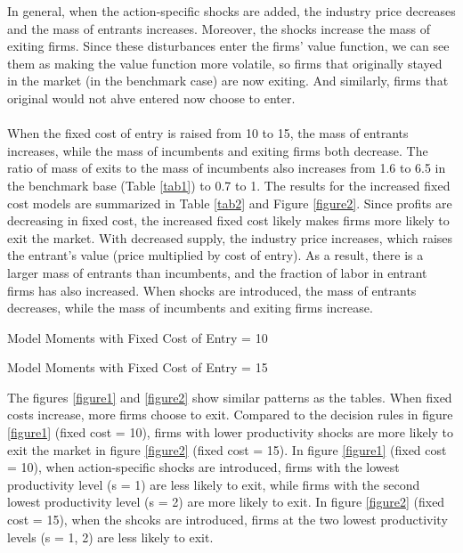 \documentclass[12pt]{article}
\begin{document}
In general, when the action-specific shocks are added, the industry price decreases and the mass of entrants increases. Moreover, the shocks increase the mass of exiting firms. Since these disturbances enter the firms' value function, we can see them as making the value function more volatile, so firms that originally stayed in the market (in the benchmark case) are now exiting. And similarly, firms that original would not ahve entered now choose to enter. \\\\
When the fixed cost of entry is raised from 10 to 15, the mass of entrants increases, while the mass of incumbents and exiting firms both decrease. The ratio of mass of exits to the mass of incumbents also increases from 1.6 to 6.5 in the benchmark base (Table \ref{tab1}) to 0.7 to 1. The results for the increased fixed cost models are summarized in Table \ref{tab2} and Figure \ref{figure2}. Since profits are decreasing in fixed cost, the increased fixed cost likely makes firms more likely to exit the market. With decreased supply, the industry price increases, which raises the entrant's value (price multiplied by cost of entry). As a result, there is a larger mass of entrants than incumbents, and the fraction of labor in entrant firms has also increased. When shocks are introduced, the mass of entrants decreases, while the mass of incumbents and exiting firms increase.


\begin{table}[!ht]
	\centering
	\caption{Model Moments with Fixed Cost of Entry = 10}
	 \label{tab1}
\end{table}
	
\begin{table}[!ht]
	\centering
	\caption{Model Moments with Fixed Cost of Entry = 15}
	 \label{tab2}
\end{table}

\FloatBarrier

The figures \ref{figure1} and \ref{figure2} show similar patterns as the tables. When fixed costs increase, more firms choose to exit. Compared to the decision rules in figure \ref{figure1} (fixed cost = 10), firms with lower productivity shocks are more likely to exit the market in figure \ref{figure2} (fixed cost = 15). In figure \ref{figure1} (fixed cost = 10), when action-specific shocks are introduced, firms with the lowest productivity level (s = 1) are less likely to exit, while firms with the second lowest productivity level (s = 2) are more likely to exit. In figure \ref{figure2} (fixed cost = 15), when the shcoks are introduced, firms at the two lowest productivity levels (s = 1, 2) are less likely to exit.
\end{document}
